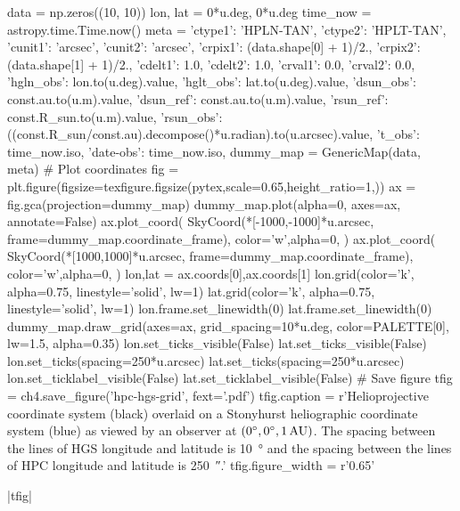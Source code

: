 \begin{pycode}[chapter4]
data = np.zeros((10, 10))
lon, lat = 0*u.deg, 0*u.deg
time_now = astropy.time.Time.now()
meta = {
    'ctype1': 'HPLN-TAN',
    'ctype2': 'HPLT-TAN',
    'cunit1': 'arcsec',
    'cunit2': 'arcsec',
    'crpix1': (data.shape[0] + 1)/2.,
    'crpix2': (data.shape[1] + 1)/2.,
    'cdelt1': 1.0,
    'cdelt2': 1.0,
    'crval1': 0.0,
    'crval2': 0.0,
    'hgln_obs': lon.to(u.deg).value,
    'hglt_obs': lat.to(u.deg).value,
    'dsun_obs': const.au.to(u.m).value,
    'dsun_ref': const.au.to(u.m).value,
    'rsun_ref': const.R_sun.to(u.m).value,
    'rsun_obs': ((const.R_sun/const.au).decompose()*u.radian).to(u.arcsec).value,
    't_obs': time_now.iso,
    'date-obs': time_now.iso,
}
dummy_map = GenericMap(data, meta)
# Plot coordinates
fig = plt.figure(figsize=texfigure.figsize(pytex,scale=0.65,height_ratio=1,))
ax = fig.gca(projection=dummy_map)
dummy_map.plot(alpha=0, axes=ax, annotate=False)
ax.plot_coord(
    SkyCoord(*[-1000,-1000]*u.arcsec, frame=dummy_map.coordinate_frame),
    color='w',alpha=0,
)
ax.plot_coord(
    SkyCoord(*[1000,1000]*u.arcsec, frame=dummy_map.coordinate_frame),
    color='w',alpha=0,
)
lon,lat = ax.coords[0],ax.coords[1]
lon.grid(color='k', alpha=0.75, linestyle='solid', lw=1)
lat.grid(color='k', alpha=0.75, linestyle='solid', lw=1)
lon.frame.set_linewidth(0)
lat.frame.set_linewidth(0)
dummy_map.draw_grid(axes=ax, grid_spacing=10*u.deg, color=PALETTE[0], lw=1.5, alpha=0.35)
lon.set_ticks_visible(False)
lat.set_ticks_visible(False)
lon.set_ticks(spacing=250*u.arcsec)
lat.set_ticks(spacing=250*u.arcsec)
lon.set_ticklabel_visible(False)
lat.set_ticklabel_visible(False)
# Save figure
tfig = ch4.save_figure('hpc-hgs-grid', fext='.pdf')
tfig.caption = r'Helioprojective coordinate system (black) overlaid on a Stonyhurst heliographic coordinate system (blue) as viewed by an observer at $(\SI{0}{\degree},\SI{0}{\degree},\num{1}\,\textup{AU})$. The spacing between the lines of HGS longitude and latitude is \SI{10}{\degree} and the spacing between the lines of HPC longitude and latitude is \SI{250}{\arcsecond}.'
tfig.figure_width = r'0.65\textwidth'
\end{pycode}
\py[chapter4]|tfig|


